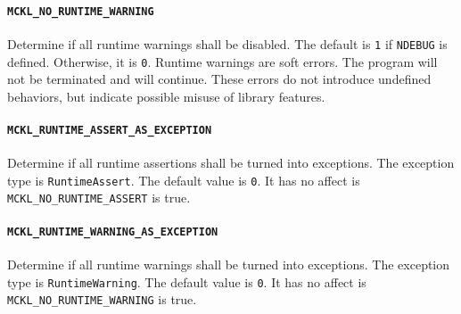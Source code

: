\paragraph{\texttt{MCKL\_NO\_RUNTIME\_WARNING}} Determine if all runtime
warnings shall be disabled. The default is \verb|1| if \verb|NDEBUG| is
defined. Otherwise, it is \verb|0|. Runtime warnings are soft errors. The
program will not be terminated and will continue. These errors do not introduce
undefined behaviors, but indicate possible misuse of library features.

\paragraph{\texttt{MCKL\_RUNTIME\_ASSERT\_AS\_EXCEPTION}} Determine if all
runtime assertions shall be turned into exceptions. The exception type is
\verb|RuntimeAssert|. The default value is \verb|0|. It has no affect is
\verb|MCKL_NO_RUNTIME_ASSERT| is true.

\paragraph{\texttt{MCKL\_RUNTIME\_WARNING\_AS\_EXCEPTION}} Determine if all
runtime warnings shall be turned into exceptions. The exception type is
\verb|RuntimeWarning|. The default value is \verb|0|. It has no affect is
\verb|MCKL_NO_RUNTIME_WARNING| is true.
